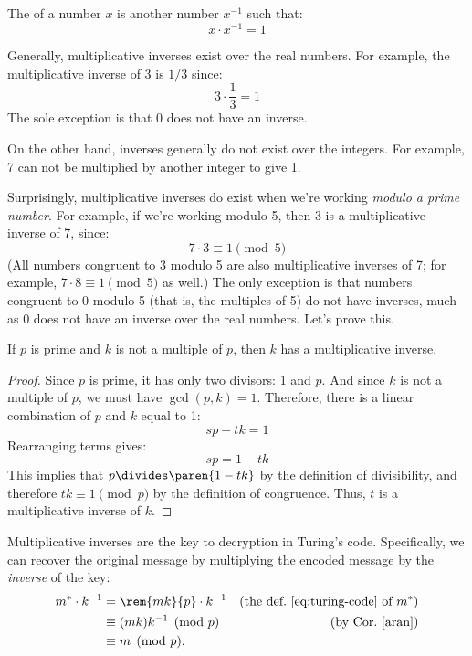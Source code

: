 \subsection{}
\label{sec:prime}

The  of a number $x$ is another number
$x^{-1}$ such that:
%
\[
x \cdot x^{-1} = 1
\]

Generally, multiplicative inverses exist over the real numbers.  For
example, the multiplicative inverse of 3 is $1 / 3$ since:
%
\[
3 \cdot \frac{1}{3} = 1
\]
%
The sole exception is that 0 does not have an inverse.

On the other hand, inverses generally do not exist over the integers.
For example, 7 can not be multiplied by another integer to give 1.

Surprisingly, multiplicative inverses do exist when we're working
\emph{modulo a prime number}.  For example, if we're working modulo
5, then 3 is a multiplicative inverse of 7, since:
%
\[
7 \cdot 3 \equiv 1 \pmod{5}
\]
%
(All numbers congruent to 3 modulo 5 are also multiplicative inverses
of 7; for example, $7 \cdot 8 \equiv 1 \pmod{5}$ as well.)  The only
exception is that numbers congruent to 0 modulo 5 (that is, the
multiples of 5) do not have inverses, much as 0 does not have an
inverse over the real numbers.  Let's prove this.

\begin{lemma}
\label{lem:inverses}
If $p$ is prime and $k$ is not a multiple of $p$, then $k$ has a
multiplicative inverse.
\end{lemma}

\begin{proof}
Since $p$ is prime, it has only two divisors: 1 and $p$.  And since
$k$ is not a multiple of $p$, we must have $\gcd(p, k) = 1$.
Therefore, there is a linear combination of $p$ and $k$ equal to 1:
%
\[
s p + t k = 1
\]
%
Rearranging terms gives:
%
\[
s p = 1 - t k
\]
%
This implies that $p \divides \paren{1 - tk}$ by the definition of divisibility,
and therefore $tk \equiv 1 \pmod{p}$ by the definition of congruence.
Thus, $t$ is a multiplicative inverse of $k$.
\end{proof}

Multiplicative inverses are the key to decryption in Turing's code.
Specifically, we can recover the original message by multiplying the
encoded message by the \emph{inverse} of the key:
\begin{align*}
m^* \cdot k^{-1}
    & = \rem{mk}{p} \cdot k^{-1}
         & \text{(the def.~\eqref{eq:turing-code} of $m^*$)}\\
    & \equiv (mk)k^{-1} \pmod{p} & \text{(by Cor.~\ref{aran})}\\
    & \equiv m \pmod{p}.
\end{align*}

